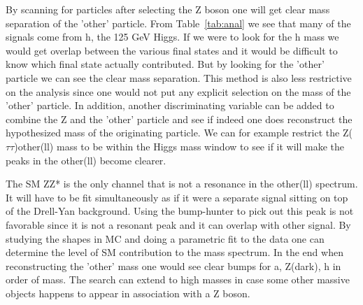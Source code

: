 
By scanning for particles after selecting the Z boson one will get clear mass separation of the 'other' particle.  From Table~\ref{tab:anal} we see that many of the signals come from h, the 125 GeV Higgs.  If we were to look for the h mass we would get overlap between the various final states and it would be difficult to know which final
state actually contributed.  But by looking for the 'other' particle we can see the clear mass separation.  This method is also less restrictive on the analysis since one would not put any explicit selection on the mass
of the 'other' particle. In addition, another discriminating variable can be added to combine the Z and the 'other' particle and see if indeed one does reconstruct the hypothesized mass of the originating particle.  We can for example restrict the Z($\tau\tau$)other(ll) mass to be within the Higgs mass window to see if it will make the peaks in the other(ll) become clearer.  





The SM ZZ* is the only channel that is not a resonance in the other(ll) spectrum.  It will have to be fit simultaneously as if it were a separate signal sitting on top of the Drell-Yan background.  Using the
bump-hunter to pick out this peak is not favorable since it is not a resonant peak and it can overlap with other signal.  By studying the shapes in MC and doing a parametric fit to the data one can determine the level of SM contribution to the mass spectrum.
In the end when reconstructing the 'other' mass one would see clear bumps for a, Z(dark), h in order of mass. The search can extend to high masses in case some other massive objects happens to appear in association with a Z boson.  

